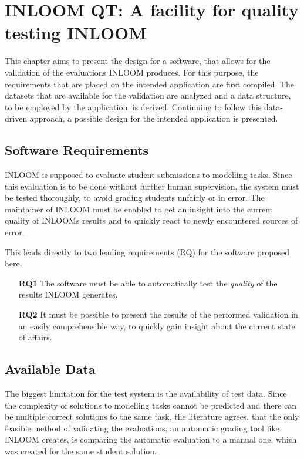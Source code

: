 \chapter{INLOOM QT: A facility for quality testing INLOOM}

This chapter aims to present the design for a software, that allows for the validation
of the evaluations INLOOM \cite{1} produces. For this purpose, the requirements that are 
placed on the intended application are first compiled. The datasets that are available for 
the validation are analyzed and a data structure, to be employed by the application, is 
derived. Continuing to follow this data-driven approach, a possible design for the intended
application is presented.



\section{Software Requirements}

INLOOM is supposed to evaluate student submissions to modelling tasks. Since this evaluation
is to be done without further human supervision, the system must be tested thoroughly, to 
avoid grading students unfairly or in error. The maintainer of INLOOM must be enabled to get
an insight into the current quality of INLOOMs results and to quickly react to newly encountered
sources of error.

This leads directly to two leading requirements (RQ) for the software proposed here. 

\begin{itemize}
    \item[\textbf{RQ1}] The software must be able to automatically test the \textit{quality} 
    of the results INLOOM generates.
    \item[\textbf{RQ2}] It must be possible to present the results of the performed validation
    in an easily comprehensible way, to quickly gain insight about the current state of affairs.
\end{itemize}



\section{Available Data}

The biggest limitation for the test system is the availability of test data. Since the
complexity of solutions to modelling tasks cannot be predicted and there can be multiple 
correct solutions to the same task, the literature agrees, that the only feasible method 
of validating the evaluations, an automatic grading tool like INLOOM creates, is comparing
the automatic evaluation to a manual one, which was created for the same student solution.

